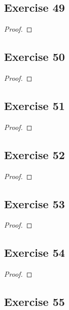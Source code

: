 \documentclass[14pt]{extarticle}
\begin{document}
\subsection{Exercise 49}

\begin{proof}

\end{proof}

\subsection{Exercise 50}

\begin{proof}

\end{proof}

\subsection{Exercise 51}

\begin{proof}

\end{proof}

\subsection{Exercise 52}

\begin{proof}

\end{proof}

\subsection{Exercise 53}

\begin{proof}

\end{proof}

\subsection{Exercise 54}

\begin{proof}

\end{proof}

\subsection{Exercise 55}
\end{document}
